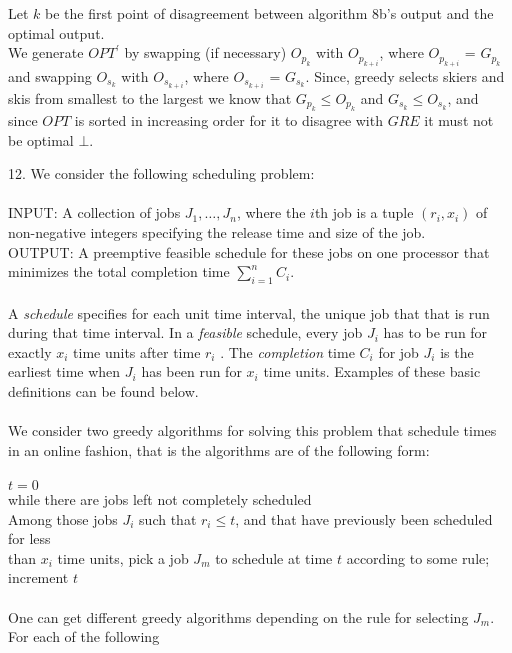 \documentclass[10pt]{article}
\newcommand{\tab}{\hspace*{2em}}
\begin{document}
\begin{enumerate}
		Let $k$ be the first point of disagreement between algorithm 8b's output and the optimal output. 
		\\
		We generate $OPT^{\prime}$ by swapping (if necessary) $O_{p_{k}}$ with $O_{p_{k+i}}$, where $O_{p_{k+i}}$ = $G_{p_{k}}$ and swapping $O_{s_{k}}$ 
		with $O_{s_{k+i}}$, where $O_{s_{k+i}}$ = $G_{s_{k}}$. Since, greedy selects skiers and skis from smallest to the largest we know
		that $G_{p_{k}} \leq O_{p_{k}}$ and $G_{s_{k}} \leq O_{s_{k}}$, and since $OPT$ is sorted in increasing order for it to disagree with $GRE$ it must
		not be optimal $\bot$. 
	\end{enumerate}
	12.  We consider the following scheduling problem:\\
	\\
	INPUT: A collection of jobs $J_{1}, \ldots , J_{n}$, where the $i$th job is a tuple $(r_{i}, x_{i})$ of non-negative integers
	specifying the release time and size of the job.\\
	OUTPUT: A preemptive feasible schedule for these jobs on one processor that minimizes the total completion time 
	$\sum_{i=1}^n C_{i}$.\\
	\\
	A \textit{schedule} specifies for each unit time interval, the unique job that that is run during that time interval.
	In a \textit{feasible} schedule, every job $J_{i}$ has to be run for exactly $x_{i}$ time units after time $r_{i}$ . The \textit{completion}
	time $C_{i}$ for job $J_{i}$ is the earliest time when $J_{i}$ has been run for $x_{i}$ time units. Examples of these basic
	definitions can be found below.\\
	\\
	We consider two greedy algorithms for solving this problem that schedule times in an online fashion,
	that is the algorithms are of the following form:\\
	\\
	$t = 0$\\
	while there are jobs left not completely scheduled\\
	\tab Among those jobs $J_{i}$ such that $r_{i} \leq t$, and that have previously been scheduled for less\\
	\tab \tab than $x_{i}$ time units, pick a job $J_{m}$ to schedule at time $t$ according to some rule;\\
	\tab increment $t$\\
	\\
	One can get different greedy algorithms depending on the rule for selecting $J_{m}$. For each of the following
\end{document}
